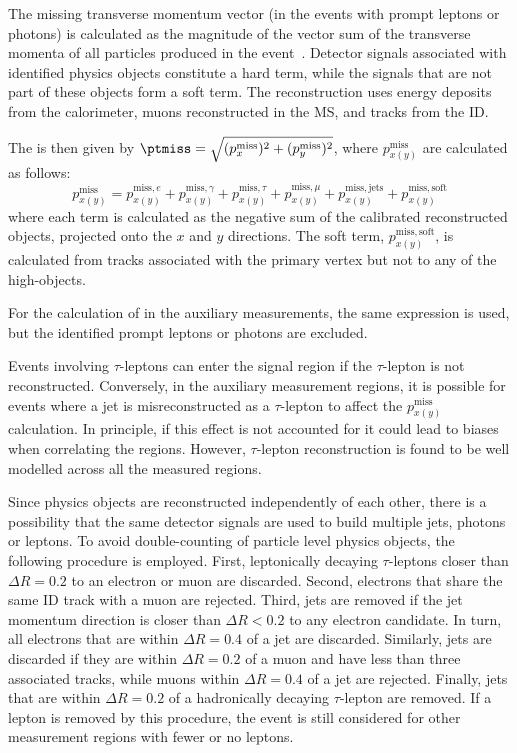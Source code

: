 \documentclass[atlasdraft=false, cernpreprint, UKenglish, texmf, orcidlogo]{atlasdoc}
\begin{document}
The missing transverse momentum vector \ptmiss (\ptrecoil in the events with prompt leptons or photons)
is calculated as the magnitude of the vector sum of the transverse momenta of all particles produced in the event~\cite{PERF-2014-04}.
Detector signals associated with identified physics objects constitute a hard term,
while the signals that are not part of these objects form a soft term.
The \ptmiss reconstruction uses energy deposits from the calorimeter, muons reconstructed in the MS, and tracks from the ID.
 
The \ptmiss is then given  by $\ptmiss = \sqrt{(p_{x}^{\mathrm{miss}})^2 + (p_{y}^{\mathrm{miss}})^2}$, where $p_{x(y)}^{\mathrm{miss}}$ are calculated as follows:
\begin{equation}\label{METcalculation}
p_{x(y)}^{\mathrm{miss}} = p_{x(y)}^{\mathrm{miss},e} + p_{x(y)}^{\mathrm{miss},\gamma} + p_{x(y)}^{\mathrm{miss},\tau} + p_{x(y)}^{\mathrm{miss},\mu} + p_{x(y)}^{\mathrm{miss,jets}} + p_{x(y)}^{\mathrm{miss,soft}}
\end{equation}
where each term is calculated as the negative sum of the calibrated reconstructed objects, projected onto the $x$ and $y$ directions.
The soft term, $p_{x(y)}^{\mathrm{miss,soft}}$, is calculated from tracks associated with the primary vertex but not to any of the
high-\pt objects.
 
For the calculation of \ptrecoil in the auxiliary measurements, the same expression is used, but the identified prompt leptons or photons are excluded.
 
Events involving $\tau$-leptons can enter the signal region if the $\tau$-lepton is not reconstructed. Conversely, in the auxiliary measurement regions, it is possible for events where a jet is misreconstructed as a $\tau$-lepton to affect the $p_{x(y)}^{\mathrm{miss}}$ calculation.
In principle, if this effect is not accounted for  it could lead to biases when correlating the regions.
However, $\tau$-lepton reconstruction is found to be well modelled across all the measured regions.
 
Since physics objects are reconstructed independently of each other, there is a possibility that the same
detector signals are used to build multiple jets, photons or leptons.
To avoid double-counting of particle level physics objects, the following procedure is employed.
First, leptonically decaying $\tau$-leptons closer than \(\Delta R=0.2\) to an electron or muon are discarded.
Second, electrons that share the same ID track with a muon are rejected.
Third, jets are removed if the jet momentum direction is closer than \(\Delta R < 0.2\) to any electron candidate.
In turn, all electrons that are within \(\Delta R = 0.4\) of a jet are discarded.
Similarly, jets are discarded if they are within \(\Delta R = 0.2\) of a muon and have less than three associated tracks,
while muons within \(\Delta R = 0.4\) of a jet are rejected.
Finally, jets that are within \(\Delta R = 0.2\) of a hadronically decaying $\tau$-lepton are removed.
If a lepton is removed by this procedure, the event is still considered for other measurement regions with fewer or no leptons.
 
\end{document}
